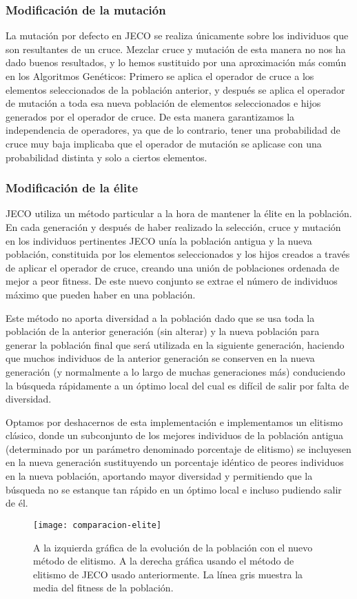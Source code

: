 \subsubsection{Modificación de la mutación}
La mutación por defecto en JECO se realiza únicamente sobre los individuos que son resultantes de un cruce. Mezclar cruce y mutación de esta manera no nos ha dado buenos resultados, y lo hemos sustituido por una aproximación más común en los Algoritmos Genéticos: Primero se aplica el operador de cruce a los elementos seleccionados de la población anterior, y después se aplica el operador de mutación a toda esa nueva población de elementos seleccionados e hijos generados por el operador de cruce. De esta manera garantizamos la independencia de operadores, ya que de lo contrario, tener una probabilidad de cruce muy baja implicaba que el operador de mutación se aplicase con una probabilidad distinta y solo a ciertos elementos.

\subsubsection{Modificación de la élite}
JECO utiliza un método particular a la hora de mantener la élite en la población. En cada generación y después de haber realizado la selección, cruce y mutación en los individuos pertinentes JECO unía la población antigua y la nueva población, constituida por los elementos seleccionados y los hijos creados a través de aplicar el operador de cruce, creando una unión de poblaciones ordenada de mejor a peor fitness. De este nuevo conjunto se extrae el número de individuos máximo que pueden haber en una población.

Este método no aporta diversidad a la población dado que se usa toda la población de la anterior generación (sin alterar) y la nueva población para generar la población final que será utilizada en la siguiente generación, haciendo que muchos individuos de la anterior generación se conserven en la nueva generación (y normalmente a lo largo de muchas generaciones más) conduciendo la búsqueda rápidamente a un óptimo local del cual es difícil de salir por falta de diversidad.

Optamos por deshacernos de esta implementación e implementamos un elitismo clásico, donde un subconjunto de los mejores individuos de la población antigua (determinado por un parámetro denominado porcentaje de elitismo) se incluyesen en la nueva generación sustituyendo un porcentaje idéntico de peores individuos en la nueva población, aportando mayor diversidad y permitiendo que la búsqueda no se estanque tan rápido en un óptimo local e incluso pudiendo salir de él.
\begin{figure}[H]
\centering
\texttt{[image: comparacion-elite]}
\caption{A la izquierda gráfica de la evolución de la población con el nuevo método de elitismo. A la derecha gráfica usando el método de elitismo de JECO usado anteriormente. La línea gris muestra la media del fitness de la población.}
\end{figure}

